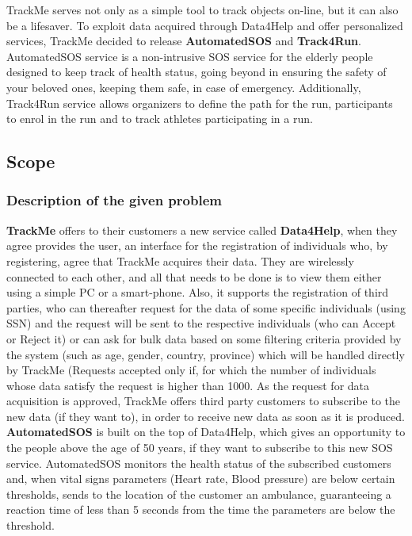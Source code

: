 \documentclass[12pt]{article}
\begin{document}
TrackMe serves not only as a simple tool to track objects on-line, but it can also be a lifesaver. To exploit data acquired through Data4Help and offer personalized services, TrackMe decided to release \textbf{AutomatedSOS} and \textbf{Track4Run}. AutomatedSOS service is a non-intrusive SOS service for the elderly people designed to keep track of health status, going beyond in ensuring the safety of your beloved ones, keeping them safe, in case of emergency. Additionally, Track4Run service allows organizers to define the path for the run, participants to enrol in the run and to track athletes participating in a run.\\

\subsection{Scope}

\subsubsection{Description of the given problem}
\textbf{TrackMe} offers to their customers a new service called \textbf{Data4Help}, when they agree provides the user, an interface for the registration of individuals who, by registering, agree that TrackMe acquires their data. They are wirelessly connected to each other, and all that needs to be done is to view them either using a simple PC or a smart-phone. Also, it supports the registration of third parties, who can thereafter request for the data of some specific individuals (using SSN) and the request will be sent to the respective individuals (who can Accept or Reject it) or can ask for bulk data based on some filtering criteria provided by the system (such as age, gender, country, province) which will be handled directly by TrackMe (Requests accepted only if, for which the number of individuals whose data satisfy the request is higher than 1000. As the request for data acquisition is approved, TrackMe offers third party customers to subscribe to the new data (if they want to), in order to receive new data as soon as it is produced.\\

\textbf{AutomatedSOS} is built on the top of Data4Help, which gives an opportunity to the people above the age of 50 years, if they want to subscribe to this new SOS service. AutomatedSOS monitors the health status of the subscribed customers and, when vital signs parameters (Heart rate, Blood pressure) are below certain thresholds, sends to the location of the customer an ambulance, guaranteeing a reaction time of less than 5 seconds from the time the parameters	are	below the threshold.\\
\end{document}
